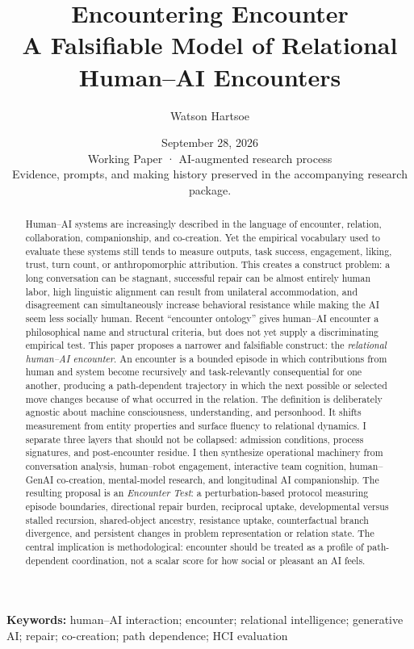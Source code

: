 \documentclass[11pt]{article}
\title{\textbf{Encountering Encounter}\\[0.35em]
\large A Falsifiable Model of Relational Human--AI Encounters}
\author{Watson Hartsoe}
\date{September 28, 2026\\[0.6em]\small Working Paper · AI-augmented research process\\Evidence, prompts, and making history preserved in the accompanying research package.}
\begin{document}
\maketitle

\begin{abstract}
Human--AI systems are increasingly described in the language of encounter, relation, collaboration, companionship, and co-creation. Yet the empirical vocabulary used to evaluate these systems still tends to measure outputs, task success, engagement, liking, trust, turn count, or anthropomorphic attribution. This creates a construct problem: a long conversation can be stagnant, successful repair can be almost entirely human labor, high linguistic alignment can result from unilateral accommodation, and disagreement can simultaneously increase behavioral resistance while making the AI seem less socially human. Recent ``encounter ontology'' gives human--AI encounter a philosophical name and structural criteria, but does not yet supply a discriminating empirical test. This paper proposes a narrower and falsifiable construct: the \emph{relational human--AI encounter}. An encounter is a bounded episode in which contributions from human and system become recursively and task-relevantly consequential for one another, producing a path-dependent trajectory in which the next possible or selected move changes because of what occurred in the relation. The definition is deliberately agnostic about machine consciousness, understanding, and personhood. It shifts measurement from entity properties and surface fluency to relational dynamics. I separate three layers that should not be collapsed: admission conditions, process signatures, and post-encounter residue. I then synthesize operational machinery from conversation analysis, human--robot engagement, interactive team cognition, human--GenAI co-creation, mental-model research, and longitudinal AI companionship. The resulting proposal is an \emph{Encounter Test}: a perturbation-based protocol measuring episode boundaries, directional repair burden, reciprocal uptake, developmental versus stalled recursion, shared-object ancestry, resistance uptake, counterfactual branch divergence, and persistent changes in problem representation or relation state. The central implication is methodological: encounter should be treated as a profile of path-dependent coordination, not a scalar score for how social or pleasant an AI feels.
\end{abstract}

\textbf{Keywords:} human--AI interaction; encounter; relational intelligence; generative AI; repair; co-creation; path dependence; HCI evaluation
\end{document}
